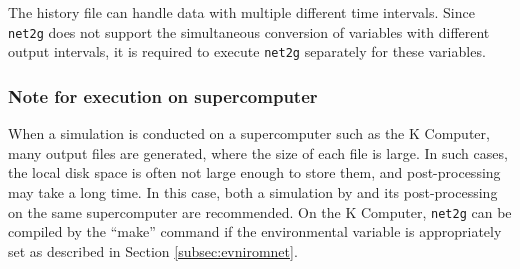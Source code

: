 The history file can handle data with multiple different time intervals. 
Since \verb|net2g| does not support the simultaneous conversion of variables with different output intervals, 
it is required to execute \verb|net2g| separately for these variables. 



\subsubsection{Note for execution on supercomputer}
When a simulation is conducted on a supercomputer such as the K Computer, many output files are generated, where the size of each file is large. In such cases, the local disk space is often not large enough to store them,  and post-processing may take a long time. In this case, both a simulation by \scalerm and its post-processing on the same supercomputer are recommended. On the K Computer, \verb|net2g| can be compiled by the ``make'' command  if the environmental variable is appropriately set as described in Section \ref{subsec:evniromnet}.
